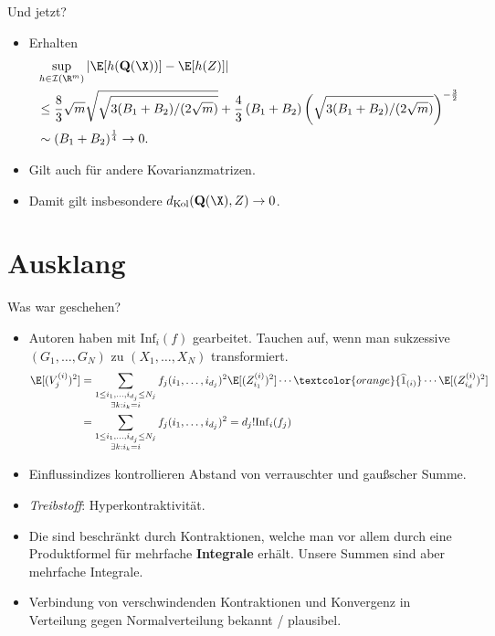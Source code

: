 \begin{frame}{Und jetzt?}
    \small 
    \begin{itemize}
        \item Erhalten
        \begin{align*}
        &\sup_{h \in \mathcal{I}(\R^m)} \left|\E[h(\mathbf{Q}(\X))] - \E[h(Z)]\right| \\ & 
        \leq \frac{8}{3}\sqrt{m}\sqrt{\sqrt{3(B_1 + B_2)/(2\sqrt{m})}} + \frac{4}{3}\left(B_1 + B_2\right)\left(\sqrt{3(B_1 + B_2)/(2\sqrt{m})}\right)^{-\frac{3}{2}} \\ & \sim (B_1+B_2)^{\frac{1}{4}} \to 0.
        \end{align*}
        \item Gilt auch für andere Kovarianzmatrizen.
        \item Damit gilt insbesondere $d_\text{Kol}(\mathbf{Q}(\X), Z) \to 0$. 
    \end{itemize}
\end{frame}


\section{Ausklang}
\begin{frame}{Was war geschehen?}
    \begin{itemize}
        \item Autoren haben mit $\mathrm{Inf}_i(f)$ gearbeitet. Tauchen auf, wenn man sukzessive $(G_1, \ldots, G_N)$ zu $(X_1, \ldots, X_N)$ transformiert. \pause \footnotesize
        \begin{align*}\E[(V_j^{(i)})^2] &= \sum_{\substack{1 \leq i_1, \ldots, i_{d_j} \leq N_j \\ \exists k: i_k = i}} f_j(i_1, \ldots, i_{d_j})^2 \E[(Z_{i_1}^{(i)})^2] \cdots \textcolor{orange}{\widehat{1}_{(i)}} \cdots \E[(Z_{i_d}^{(i)})^2] \\ &= \sum_{\substack{1 \leq i_1, \ldots, i_{d_j} \leq N_j \\ \exists k: i_k = i}} f_j(i_1, \ldots, i_{d_j})^2 = d_j! \mathrm{Inf}_i(f_j) \end{align*} 
        \normalsize
        \item Einflussindizes kontrollieren Abstand von verrauschter und gaußscher Summe.
        \pause
        \item \textit{Treibstoff}: Hyperkontraktivität.
        \pause
        \item Die sind beschränkt durch Kontraktionen, welche man vor allem durch eine Produktformel für mehrfache \textbf{Integrale} erhält. Unsere Summen sind aber mehrfache Integrale. 
        \item Verbindung von verschwindenden Kontraktionen und Konvergenz in Verteilung gegen Normalverteilung bekannt / plausibel.
        
    \end{itemize}
\end{frame}

